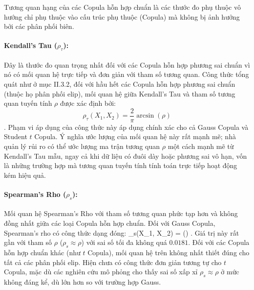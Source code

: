 Tương quan hạng của các Copula hỗn hợp chuẩn là các thước đo phụ thuộc vô hướng chỉ phụ thuộc vào cấu trúc phụ thuộc (Copula) mà không bị ảnh hưởng bởi các phân phối biên.

\paragraph{Kendall's Tau ($\rho_\tau$):}
Đây là thước đo quan trọng nhất đối với các Copula hỗn hợp phương sai chuẩn vì nó có mối quan hệ trực tiếp và đơn giản với tham số tương quan. Công thức tổng quát như ở mục II.3.2, đối với hầu hết các Copula hỗn hợp phương sai chuẩn (thuộc họ phân phối elip), mối quan hệ giữa Kendall's Tau và tham số tương quan tuyến tính $\rho$ được xác định bởi:
$$\rho_\tau(X_1, X_2) = \frac{2}{\pi} \arcsin(\rho)$$ .
Phạm vi áp dụng của công thức này áp dụng chính xác cho cả Gauss Copula và Student $t$ Copula. Ý nghĩa ước lượng của mối quan hệ này rất mạnh mẽ; nhà quản lý rủi ro có thể ước lượng ma trận tương quan $\rho$ một cách mạnh mẽ từ Kendall's Tau mẫu, ngay cả khi dữ liệu có đuôi dày hoặc phương sai vô hạn, vốn là những trường hợp mà tương quan tuyến tính tính toán trực tiếp hoạt động kém hiệu quả.

\paragraph{Spearman's Rho ($\rho_s$):}
Mối quan hệ Spearman's Rho với tham số tương quan phức tạp hơn và không đồng nhất giữa các loại Copula hỗn hợp chuẩn. Đối với Gauss Copula, Spearman's rho có công thức dạng đóng:
\bea
\rho_s(X_1, X_2) =  \arcsin\left(\right) .
\eea
Giá trị này rất gần với tham số $\rho$ ($\rho_s \approx \rho$) với sai số tối đa không quá $0.0181$. Đối với các Copula hỗn hợp chuẩn khác (như $t$ Copula), mối quan hệ trên không nhất thiết đúng cho tất cả các phân phối elip. Hiện chưa có công thức đơn giản tương tự cho $t$ Copula, mặc dù các nghiên cứu mô phỏng cho thấy sai số xấp xỉ $\rho_s \approx \rho$ ở mức không đáng kể, dù lớn hơn so với trường hợp Gauss.
